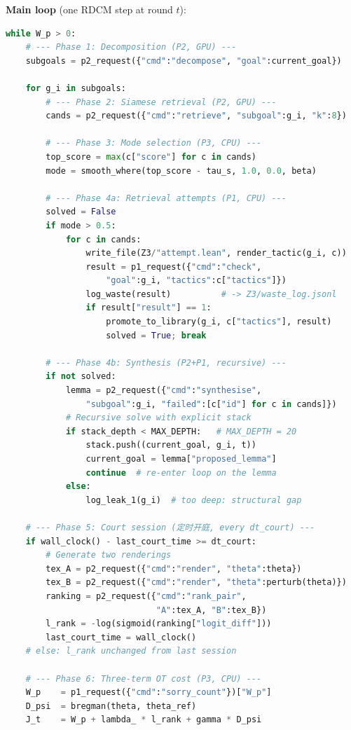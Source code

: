 \documentclass[11pt,a4paper]{article}
\theoremstyle{definition}
\theoremstyle{remark}
\begin{document}
\textbf{Main loop} (one RDCM step at round $t$):

\begin{lstlisting}[language=Python,caption={Daemon main loop (maximum detail)}]
while W_p > 0:
    # --- Phase 1: Decomposition (P2, GPU) ---
    subgoals = p2_request({"cmd":"decompose", "goal":current_goal})

    for g_i in subgoals:
        # --- Phase 2: Siamese retrieval (P2, GPU) ---
        cands = p2_request({"cmd":"retrieve", "subgoal":g_i, "k":8})

        # --- Phase 3: Mode selection (P3, CPU) ---
        top_score = max(c["score"] for c in cands)
        mode = smooth_where(top_score - tau_s, 1.0, 0.0, beta)

        # --- Phase 4a: Retrieval attempts (P1, CPU) ---
        solved = False
        if mode > 0.5:
            for c in cands:
                write_file(Z3/"attempt.lean", render_tactic(g_i, c))
                result = p1_request({"cmd":"check",
                    "goal":g_i, "tactics":c["tactics"]})
                log_waste(result)          # -> Z3/waste_log.jsonl
                if result["result"] == 1:
                    promote_to_library(g_i, c["tactics"], result)
                    solved = True; break

        # --- Phase 4b: Synthesis (P2+P1, recursive) ---
        if not solved:
            lemma = p2_request({"cmd":"synthesise",
                "subgoal":g_i, "failed":[c["id"] for c in cands]})
            # Recursive solve with explicit stack
            if stack_depth < MAX_DEPTH:   # MAX_DEPTH = 20
                stack.push((current_goal, g_i, t))
                current_goal = lemma["proposed_lemma"]
                continue  # re-enter loop on the lemma
            else:
                log_leak_1(g_i)  # too deep: structural gap

    # --- Phase 5: Court session (定时开庭, every dt_court) ---
    if wall_clock() - last_court_time >= dt_court:
        # Generate two renderings
        tex_A = p2_request({"cmd":"render", "theta":theta})
        tex_B = p2_request({"cmd":"render", "theta":perturb(theta)})
        ranking = p2_request({"cmd":"rank_pair",
                              "A":tex_A, "B":tex_B})
        l_rank = -log(sigmoid(ranking["logit_diff"]))
        last_court_time = wall_clock()
    # else: l_rank unchanged from last session

    # --- Phase 6: Three-term OT cost (P3, CPU) ---
    W_p    = p1_request({"cmd":"sorry_count"})["W_p"]
    D_psi  = bregman(theta, theta_ref)
    J_t    = W_p + lambda_ * l_rank + gamma * D_psi


\end{lstlisting}
\end{document}
